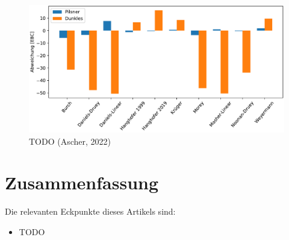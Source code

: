 \documentclass[a4paper,parskip=half]{scrartcl}
\begin{document}
\begin{figure}[h]
\centering
\includegraphics[width=14cm]{graph_dev.pdf}
\caption{TODO (Ascher, 2022)}
\label{fig:modelcompare}
\end{figure}

\section*{Zusammenfassung}


\parencite{Bruecklmeier2018}
\parencite{Holle2010}

\parencite{Smith2008}
\parencite{Bies2010}
\parencite{Tucker2017}

\parencite{KrausWeyermann2021a}
\parencite{KrausWeyermann2021b}
\parencite{KrausWeyermann2021c}

\parencite{Lange2016}
\parencite{Caro2019}
\parencite{Daniels2012}

Die relevanten Eckpunkte dieses Artikels sind:

\begin{itemize}
\item TODO
\end{itemize}

\printbibliography[title=Quellen]
\end{document}

